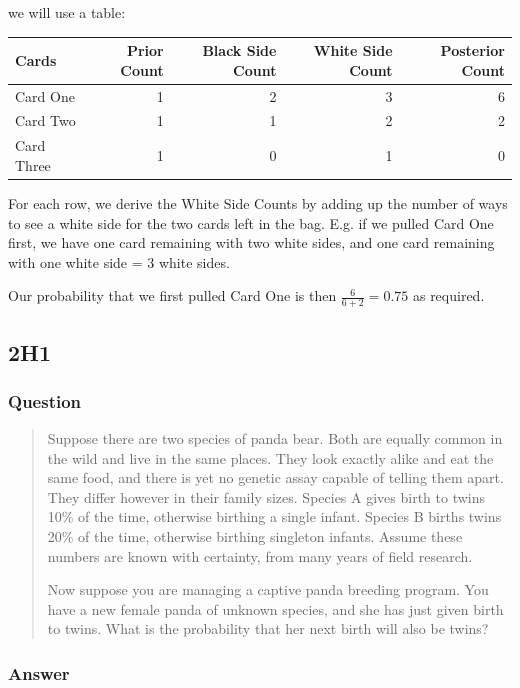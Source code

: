 \documentclass[
]{book}
\begin{document}
we will use a table:

\begin{tabular}{l|r|r|r|r}
\hline
Cards & Prior Count & Black Side Count & White Side Count & Posterior Count\\
\hline
Card One & 1 & 2 & 3 & 6\\
\hline
Card Two & 1 & 1 & 2 & 2\\
\hline
Card Three & 1 & 0 & 1 & 0\\
\hline
\end{tabular}

For each row, we derive the White Side Counts by adding up the number of ways to see a white side for the two cards left in the bag. E.g. if we pulled Card One first, we have one card remaining with two white sides, and one card remaining with one white side = 3 white sides.

Our probability that we first pulled Card One is then \(\frac{6}{6+2} = 0.75\) as required.

\hypertarget{h1}{%
\subsection*{2H1}\label{h1}}

\hypertarget{question-11}{%
\subsubsection*{Question}\label{question-11}}

\begin{quote}
Suppose there are two species of panda bear. Both are equally common in the wild and live in the same places. They look exactly alike and eat the same food, and there is yet no genetic assay capable of telling them apart. They differ however in their family sizes. Species A gives birth to twins 10\% of the time, otherwise birthing a single infant. Species B births twins 20\% of the time, otherwise birthing singleton infants. Assume these numbers are known with certainty, from many years of field research.

Now suppose you are managing a captive panda breeding program. You have a new female panda of unknown species, and she has just given birth to twins. What is the probability that her next birth will also be twins?
\end{quote}

\hypertarget{answer-11}{%
\subsubsection*{Answer}\label{answer-11}}
\end{document}
